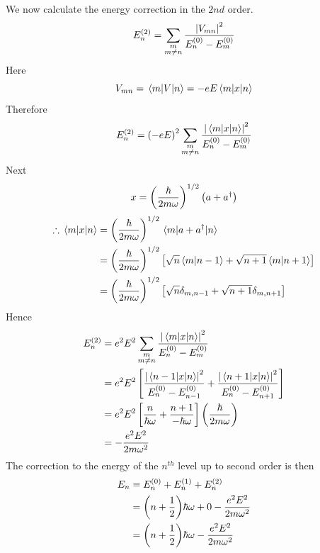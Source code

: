 \begin{enumerate}[label=Problem.\arabic*,start=1]
			We now calculate the energy correction in the $2nd$ order.
			\begin{equation}
				E_n^{(2)} = \sum_{\substack{m \\ m \neq n}} \frac{\abs{V_{m n} }^2}{E_n^{(0)} - E_m^{(0)}}
			\end{equation}
			Here
			\begin{equation}
				V_{m n} = \mel{m}{V}{n} = - e E \mel{m}{x}{n}
			\end{equation}
			Therefore
			\begin{equation}
				E_n^{(2)} = \left(-e E\right)^2 \sum_{\substack{m \\ m \neq n}} \frac{\abs{\mel{m}{x}{n}}^2}{E_n^{(0)} - E_m^{(0)}}
			\end{equation}
			Next
			\begin{equation}
				x = \left(\frac{\hbar}{2 m \omega}\right)^{1/2} \qty(a + a^\dagger)
			\end{equation}
			\begin{align*}
			\therefore \mel{m}{x}{n} 
			&= \left(\frac{\hbar}{2 m \omega}\right)^{1/2} \mel{m}{a + a^\dagger}{n} \\
			&= \left(\frac{\hbar}{2 m \omega}\right)^{1/2} \left[\sqrt{n} \braket{m}{n-1}  +  \sqrt{n+1}\braket{m}{n+1}\right] \\
			&= \left(\frac{\hbar}{2 m \omega}\right)^{1/2} \left[\sqrt{n} \delta_{m,n-1} + \sqrt{n+1} \delta_{m, n+1}\right]
			\end{align*}
			Hence
			\begin{align*}
				E_n^{(2)} 
				&= e^2 E^2 \sum_{\substack{m \\ m \neq n}} \frac{\abs{\mel{m}{x}{n}}^2}{E_n^{(0)} - E_m^{(0)} }\\
				&= e^2 E^2 \left[
				\frac{\abs{\mel{n-1}{x}{n}}^2}{E_n^{(0)}-E_{n-1}^{(0)}}
				+
				\frac{\abs{\mel{n+1}{x}{n}}^2}{E_n^{(0)}-E_{n+1}^{(0)}}
				\right]\\
				&= e^2 E^2 \left[\frac{n}{\hbar \omega} + \frac{n+1}{-\hbar\omega}\right] \left(\frac{\hbar}{2 m \omega}\right)\\
				&= - \frac{e^2 E^2}{2 m \omega^2}
			\end{align*}
			The correction to the energy of the $n^{th}$ level up to second order is then
			\begin{align*}
				E_n &=	E_n^{(0)}  + E_n^{(1)} + E_n^{(2)} \\
				&= \qty(n + \frac{1}{2}) \hbar\omega + 0 - \frac{e^2 E^2}{2 m \omega^2}\\
				&= \qty(n + \frac{1}{2}) \hbar\omega - \frac{e^2 E^2}{2 m \omega^2}
			\end{align*}
			

\end{enumerate}
